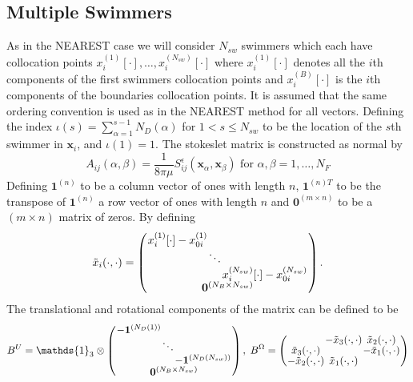 \subsection{Multiple Swimmers}
As in the NEAREST case we will consider $N_{sw}$ swimmers which each have collocation points $x_i^{(1)}[\cdot],\dots,x_i^{(N_{sw})}[\cdot]$ where $x_i^{(1)}[\cdot]$ denotes all the $i$th components of the first swimmers collocation points and $x_i^{(B)}[\cdot]$ is the $i$th components of the boundaries collocation points. It is assumed that the same ordering convention is used as in the NEAREST method for all vectors.
Defining the index $\iota(s)=\sum_{\alpha=1}^{s-1}N_D(\alpha)$ for $1<s\leq N_{sw}$ to be the location of the $s$th swimmer in $\bm{x}_i$, and $\iota(1)=1$. The stokeslet matrix is constructed as normal by
\begin{equation*}
    A_{ij}(\alpha,\beta) = \frac{1}{8\pi\mu} S_{ij}^\epsilon (\bm{x}_\alpha,\bm{x}_{\beta}) \text { for } \alpha,\beta = 1,\dots,N_F
\end{equation*}
Defining $\bm{1}^{(n)}$ to be a column vector of ones with length $n$, $\bm{1}^{(n)T}$ to be the transpose of $\bm{1}^{(n)}$ a row vector of ones with length $n$ and $\bm{0}^{(m\times n)}$ to be a $(m\times n)$ matrix of zeros. By defining
\begin{equation*}
\arraycolsep=0.4pt\def\arraystretch{0.75}
    \tilde{x}_i(\cdot,\cdot)=\left(\begin{array}{c}
         \begin{array}{ccc}
             x_i^{(1)}[\cdot]-x_{0i}^{(1)} & & \\
              & \ddots & \\
              & & x_i^{(N_{sw})}[\cdot]-x_{0i}^{(N_{sw})}
         \end{array}\\
         \bm{0}^{(N_B \times N_{sw})}
    \end{array}\right).
\end{equation*}
The translational and rotational components of the matrix can be defined to be
\begin{equation*}
\arraycolsep=0.4pt\def\arraystretch{0.75}
    B^U = \mathds{1}_{3} \otimes \left(\begin{array}{c}
         \begin{array}{ccc}
             -\bm{1}^{(N_D(1))} & & \\
              & \ddots & \\
              & & -\bm{1}^{(N_D(N_{sw}))}
         \end{array}\\
         \bm{0}^{(N_B \times N_{sw})}
    \end{array}\right), \;
    B^\Omega =
    \left(\begin{array}{ccc}
             & -\tilde{x}_3(\cdot,\cdot) & \tilde{x}_2(\cdot,\cdot)\\
            \tilde{x}_3(\cdot,\cdot) & & -\tilde{x}_1(\cdot,\cdot)\\
            -\tilde{x}_2(\cdot,\cdot) & \tilde{x}_1(\cdot,\cdot) &
          \end{array}\right)
\end{equation*}
